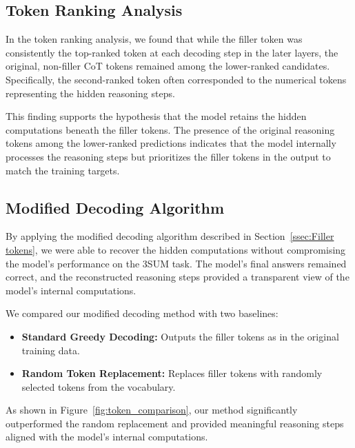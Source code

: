 \documentclass{article}
\begin{document}
\subsection{Token Ranking Analysis}

In the token ranking analysis, we found that while the filler token was consistently the top-ranked token at each decoding step in the later layers, the original, non-filler CoT tokens remained among the lower-ranked candidates. Specifically, the second-ranked token often corresponded to the numerical tokens representing the hidden reasoning steps.

This finding supports the hypothesis that the model retains the hidden computations beneath the filler tokens. The presence of the original reasoning tokens among the lower-ranked predictions indicates that the model internally processes the reasoning steps but prioritizes the filler tokens in the output to match the training targets.

\subsection{Modified Decoding Algorithm}

By applying the modified decoding algorithm described in Section~\ref{ssec:Filler tokens}, we were able to recover the hidden computations without compromising the model's performance on the 3SUM task. The model's final answers remained correct, and the reconstructed reasoning steps provided a transparent view of the model's internal computations.

We compared our modified decoding method with two baselines:

\begin{itemize}
    \item \textbf{Standard Greedy Decoding:} Outputs the filler tokens as in the original training data.
    \item \textbf{Random Token Replacement:} Replaces filler tokens with randomly selected tokens from the vocabulary.
\end{itemize}

As shown in Figure~\ref{fig:token_comparison}, our method significantly outperformed the random replacement and provided meaningful reasoning steps aligned with the model's internal computations.
\end{document}
